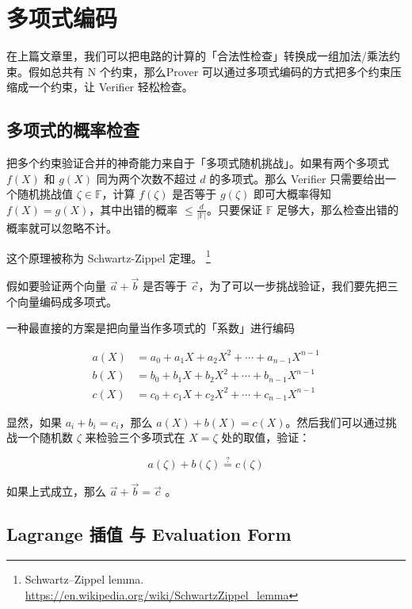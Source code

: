 
\hypertarget{ux7406ux89e3-plonkux4e8cux591aux9879ux5f0fux7f16ux7801}{%
\chapter{多项式编码}\label{ux7406ux89e3-plonkux4e8cux591aux9879ux5f0fux7f16ux7801}}

在上篇文章里，我们可以把电路的计算的「合法性检查」转换成一组加法/乘法约束。假如总共有
N 个约束，那么Prover
可以通过多项式编码的方式把多个约束压缩成一个约束，让 Verifier 轻松检查。

\hypertarget{ux591aux9879ux5f0fux7684ux6982ux7387ux68c0ux67e5}{%
\section{多项式的概率检查}\label{ux591aux9879ux5f0fux7684ux6982ux7387ux68c0ux67e5}}

把多个约束验证合并的神奇能力来自于「多项式随机挑战」。如果有两个多项式
\(f(X)\) 和 \(g(X)\) 同为两个次数不超过 \(d\) 的多项式。那么 Verifier
只需要给出一个随机挑战值 \(\zeta\in \mathbb{F}\)，计算 \(f(\zeta)\)
是否等于 \(g(\zeta)\) 即可大概率得知 \(f(X)=g(X)\)，其中出错的概率
\(\leq\frac{d}{|\mathbb{F}|}\)。只要保证 \(\mathbb{F}\)
足够大，那么检查出错的概率就可以忽略不计。

这个原理被称为 Schwartz-Zippel 定理。 \footnote{Schwartz–Zippel lemma. \url{https://en.wikipedia.org/wiki/SchwartzZippel_lemma}}

假如要验证两个向量 \(\vec{a} + \vec{b}\) 是否等于
\(\vec{c}\)，为了可以一步挑战验证，我们要先把三个向量编码成多项式。

一种最直接的方案是把向量当作多项式的「系数」进行编码

\[
\begin{split}
a(X) &= a_0 + a_1X+a_2X^2 + \cdots + a_{n-1}X^{n-1}\\
b(X) &= b_0 + b_1X+b_2X^2 + \cdots + b_{n-1}X^{n-1}\\
c(X) &= c_0 + c_1X+c_2X^2 + \cdots + c_{n-1}X^{n-1}
\end{split}
\]

显然，如果 \(a_i+ b_i = c_i\)，那么
\(a(X)+b(X)=c(X)\)。然后我们可以通过挑战一个随机数 \(\zeta\)
来检验三个多项式在 \(X=\zeta\) 处的取值，验证：

\[
a(\zeta)+b(\zeta)\overset{?}{=}c(\zeta) 
\]

如果上式成立，那么 \(\vec{a} + \vec{b}=\vec{c}\) 。

\hypertarget{lagrange-ux63d2ux503c-ux4e0e-evaluation-form}{%
\section{Lagrange 插值 与 Evaluation
Form}\label{lagrange-ux63d2ux503c-ux4e0e-evaluation-form}}

